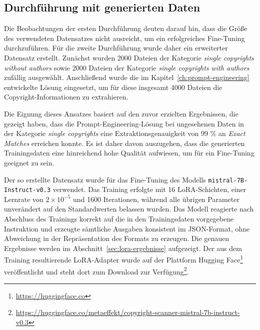 \subsection{Durchführung mit generierten Daten}

Die Beobachtungen der ersten Durchführung deuten darauf hin, dass die Größe des verwendeten Datensatzes nicht ausreicht, um ein erfolgreiches Fine-Tuning durchzuführen.
Für die zweite Durchführung wurde daher ein erweiterter Datensatz erstellt.
Zunächst wurden 2000 Dateien der Kategorie \textit{single copyrights without authors} sowie 2000 Dateien der Kategorie \textit{single copyrights with authors} zufällig ausgewählt.
Anschließend wurde die im Kapitel~\ref{ch:prompt-engineering} entwickelte Lösung eingesetzt, um für diese insgesamt 4000 Dateien die Copyright-Informationen zu extrahieren.

Die Eignung dieses Ansatzes basiert auf den zuvor erzielten Ergebnissen, die gezeigt haben, dass die Prompt-Engineering-Lösung bei ungesehenen Daten in der Kategorie \textit{single copyrights} eine Extraktionsgenauigkeit von \num{99} \% an \textit{Exact Matches} erreichen konnte.
Es ist daher davon auszugehen, dass die generierten Trainingsdaten eine hinreichend hohe Qualität aufwiesen, um für ein Fine-Tuning geeignet zu sein.

Der so erstellte Datensatz wurde für das Fine-Tuning des Modells \texttt{mistral-7B-Instruct-v0.3} verwendet.
Das Training erfolgte mit 16 LoRA-Schichten, einer Lernrate von $2 \times 10^{-5}$ und \num{1600} Iterationen, während alle übrigen Parameter unverändert auf den Standardwerten belassen wurden.
Das Modell reagierte nach Abschluss des Trainings korrekt auf die in den Trainingsdaten vorgegebene Instruktion und erzeugte sämtliche Ausgaben konsistent im JSON-Format, ohne Abweichung in der Repräsentation des Formats zu erzeugen.
Die genauen Ergebnisse werden im Abschnitt~\ref{sec:lora-ergebnisse} aufgezeigt.
Der aus dem Training resultierende LoRA-Adapter wurde auf der Plattform Hugging Face\footnote{\url{https://huggingface.co}} veröffentlicht und steht dort zum Download zur Verfügung\footnote{\url{https://huggingface.co/metaeffekt/copyright-scanner-mistral-7b-instruct-v0.3}}.

